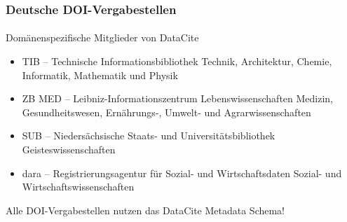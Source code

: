 \begin{frame}
    \frametitle{Deutsche DOI-Vergabestellen}
    \framesubtitle{}

    \begin{block}{Domänenspezifische Mitglieder von DataCite}
        \begin{itemize}
            \item TIB -- Technische Informationsbibliothek \newline
                Technik, Architektur, Chemie, Informatik, Mathematik und Physik
            \item ZB MED -- Leibniz-Informationszentrum Lebenswissenschaften \newline
                Medizin, Gesundheitswesen, Ernährungs-, Umwelt- und Agrarwissenschaften 
            \item SUB -- Niedersächsische Staats- und Universitätsbibliothek \newline
                Geisteswissenschaften
            \item da\textbar{}ra -- Registrierungsagentur für Sozial- und Wirtschaftsdaten
                Sozial- und Wirtschaftswissenschaften 
        \end{itemize}

        Alle DOI-Vergabestellen nutzen das DataCite Metadata Schema!
    \end{block}
\end{frame}


